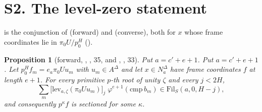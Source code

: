 \documentclass[11pt]{article}
\newcommand{\NN}{N^{\Delta}}
\newcommand{\Fil}{\mathrm{Fil}}
\newtheorem{prop}[lemma]{Proposition}
\theoremstyle{definition}
\theoremstyle{remark}
\begin{document}
\section{S2. The level-zero statement}\label{sec:lev0}

 is the conjunction of  (forward) and  (converse), both for $x$ whose frame coordinates lie in $\pi_0U/p_0^{H}$ ().

\begin{prop}[forward, , , 35, and , , 33]\label{prop:fwd}
Put $a=c'+e+1$. Put $a=c'+e+1$. Let $p_0^{H}f_m=e_a\pi_0Uu_m$ with $u_m\in A^\Delta$ and let $x\in\NN_{a}$ have frame coordinates $f$ at length $e+1$. For every primitive $p$-th root of unity $\zeta$ and every $j<2H$,
\[
\sum_m\bigl[\mathrm{lev}_{a,\zeta}(\pi_0Uu_m)\bigr]_j\;\varphi^{e+1}(\mathrm{cmp}\,b_m)\in\Fil_S(a,0,H-j),
\]
and consequently $p^\kappa f$ is sectioned for some $\kappa$.
\end{prop}
\end{document}
